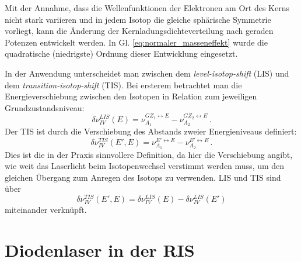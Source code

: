 Mit der Annahme, dass die Wellenfunktionen der Elektronen am Ort des Kerns
nicht stark variieren und in jedem Isotop die gleiche sphärische Symmetrie
vorliegt, kann die Änderung der Kernladungsdichteverteilung nach geraden
Potenzen entwickelt werden. In Gl. \eqref{eq:normaler_masseneffekt} wurde
die quadratische (niedrigste) Ordnung dieser Entwicklung eingesetzt.\par
In der Anwendung unterscheidet man zwischen dem \textit{level-isotop-shift}
(LIS) und dem \textit{transition-isotop-shift} (TIS). Bei ersterem betrachtet
man die Energieverschiebung zwischen den Isotopen in Relation zum jeweiligen
Grundzustandsniveau:
\begin{equation}\label{eq:LIS}
	\delta\nu_{IV}^{LIS}(E)=\nu_{A_1}^{GZ_1\leftrightarrow
	E}-\nu_{A_2}^{GZ_2\leftrightarrow E}\,.
\end{equation}
Der TIS ist durch die Verschiebung des Abstands zweier Energieniveaus definiert:
\begin{equation}\label{eq:TIS}
	\delta\nu_{IV}^{TIS}(E',E)=\nu_{A_1}^{E'\leftrightarrow
	E}-\nu_{A_2}^{E'\leftrightarrow E}\,.
\end{equation}
Dies ist die in der Praxis sinnvollere Definition, da hier die Verschiebung
angibt, wie weit das Laserlicht beim Isotopenwechsel verstimmt werden muss, um
den gleichen Übergang zum Anregen des Isotops zu verwenden. LIS und TIS sind
über
\begin{equation}\label{eq:TIS_LIS_verknuepfung}
	\delta\nu_{IV}^{TIS}(E',E)=\delta\nu_{IV}^{LIS}(E)-\delta\nu_{IV}^{LIS}(E')
\end{equation}
miteinander verknüpft.

\section{Diodenlaser in der RIS}\label{sec:diodenlaser}
